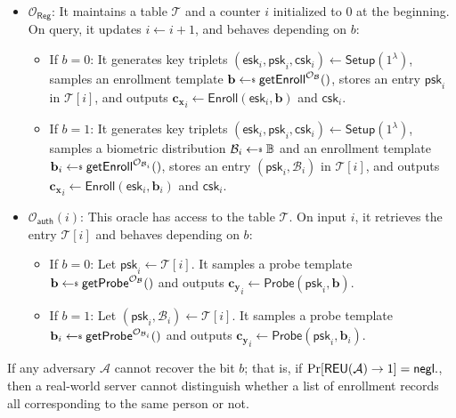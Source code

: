 \begin{itemize}
	\item $\mathcal{O}_{\textsf{Reg}}$: It maintains a table $\mathcal{T}$ and a counter $i$ initialized to $0$ at the beginning. On query, it updates $i \gets i+1$, and behaves depending on $b$:
	\begin{itemize}
		\item If $b = 0$: It generates key triplets $(\textsf{esk}_i, \textsf{psk}_i, \textsf{csk}_i) \gets \textsf{Setup}(1^\lambda)$, samples an enrollment template $\mathbf{b} \getsdollar \textsf{getEnroll}^{\mathcal{O}_{\mathcal{B}}}()$, stores an entry $\textsf{psk}_i$ in $\mathcal{T}[i]$, and outputs $\mathbf{c_x}_i \gets \textsf{Enroll}(\textsf{esk}_i, \mathbf{b})$ and $\textsf{csk}_i$.

		\item If $b = 1$: It generates key triplets $(\textsf{esk}_i, \textsf{psk}_i, \textsf{csk}_i) \gets \textsf{Setup}(1^\lambda)$, samples a biometric distribution $\mathcal{B}_i \getsdollar \mathbb{B}$ and an enrollment template $\mathbf{b}_i \getsdollar \textsf{getEnroll}^{\mathcal{O}_{\mathcal{B}_i}}()$, stores an entry $(\textsf{psk}_i, \mathcal{B}_i)$ in $\mathcal{T}[i]$, and outputs $\mathbf{c_x}_i \gets \textsf{Enroll}(\textsf{esk}_i, \mathbf{b}_i)$ and $\textsf{csk}_i$.
	\end{itemize}

	\item $\mathcal{O}_{\textsf{auth}}(i)$: This oracle has access to the table $\mathcal{T}$. On input $i$, it retrieves the entry $\mathcal{T}[i]$ and behaves depending on $b$:
	\begin{itemize}
		\item If $b = 0$: Let $\textsf{psk}_i \gets \mathcal{T}[i]$. It samples a probe template $\mathbf{b} \getsdollar \textsf{getProbe}^{\mathcal{O}_{\mathcal{B}}}()$ and outputs $\mathbf{c_y}_i \gets \textsf{Probe}(\textsf{psk}_i, \mathbf{b})$.

		\item If $b = 1$: Let $(\textsf{psk}_i, \mathcal{B}_i) \gets \mathcal{T}[i]$. It samples a probe template $\mathbf{b}_i \getsdollar \textsf{getProbe}^{\mathcal{O}_{\mathcal{B}_i}} ()$ and outputs $\mathbf{c_y}_i \gets \textsf{Probe}(\textsf{psk}_i, \mathbf{b}_i)$.
	\end{itemize}
	
\end{itemize}
If any adversary $\mathcal{A}$ cannot recover the bit $b$; that is, if $\Pr[ \textsf{REU}(\mathcal{A}) \to 1 ] = \mathsf{negl}.$, then a real-world server cannot distinguish whether a list of enrollment records all corresponding to the same person or not.

